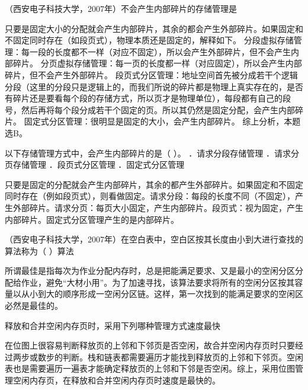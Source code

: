 \question （西安电子科技大学，2007年）不会产生内部碎片的存储管理是
\par{}
\begin{solution}只要是固定大小的分配就会产生内部碎片，其余的都会产生外部碎片。如果固定和不固定同时存在（如段页式），物理本质还是固定的，解释如下。
分段虚拟存储管理：每一段的长度都不一样（对应不固定），所以会产生外部碎片，但不会产生内部碎片。
分页虚拟存储管理：每一页的长度都一样（对应固定），所以会产生内部碎片，但不会产生外部碎片。
段页式分区管理：地址空间首先被分成若干个逻辑分段（这里的分段只是逻辑上的，而我们所说的碎片都是物理上真实存在的，是否有碎片还是要看每个段的存储方式，所以页才是物理单位），每段都有自己的段号，然后再将每个段分成若干个固定的页。所以其仍然是固定分配，会产生内部碎片。
固定式分区管理：很明显是固定的大小，会产生内部碎片。 综上分析，本题选B。
\end{solution}
\question 以下存储管理方式中，会产生内部碎片的是（ ）。 ．请求分段存储管理
．请求分页存储管理 ．段页式分区管理 ．固定式分区管理
\par{}
\begin{solution}只要是固定的分配就会产生内部碎片，其余的都产生外部碎片。如果固定和不固定同时存在（例如段页式），则看做固定。请求分段：每段的长度不同（不固定），产生外部碎片。请求分页：每页大小固定，产生内部碎片。段页式：视为固定，产生内部碎片。固定式分区管理产生的是内部碎片。
\end{solution}
\question （西安电子科技大学，2007年）在空白表中，空白区按其长度由小到大进行查找的算法称为（
）算法
\par{}
\begin{solution}所谓最佳是指每次为作业分配内存时，总是把能满足要求、又是最小的空闲分区分配给作业，避免``大材小用''。为了加速寻找，该算法要求将所有的空闲分区按其容量以从小到大的顺序形成一空闲分区链。这样，第一次找到的能满足要求的空闲区必然是最佳的。
\end{solution}
\question 释放和合并空闲内存页时，采用下列哪种管理方式速度最快
\par{}
\begin{solution}在位图上很容易判断释放页的上邻和下邻页是否空闲，故合并空闲内存页时只要经过两步或数步的判断。栈和链表都需要遍历才能找到释放页的上邻和下邻页。空闲表也是需要遍历一遍表才能确定释放页的上邻和下邻是否空闲。综上，采用位图管理空闲内存页，在释放和合并空闲内存页时速度是最快的。
\end{solution}
